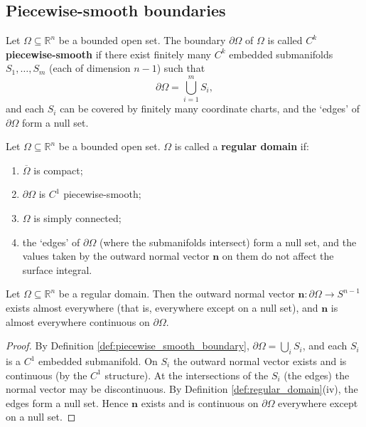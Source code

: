 \subsection{Piecewise-smooth boundaries}

\begin{definition}\label{def:piecewise_smooth_boundary}
Let $\Omega \subseteq \mathbb{R}^n$ be a bounded open set. The boundary $\partial \Omega$ of $\Omega$ is called \textbf{$C^k$ piecewise-smooth} if there exist finitely many $C^k$ embedded submanifolds $S_1, \dots, S_m$ (each of dimension $n-1$) such that
\[
\partial \Omega = \bigcup_{i=1}^{m} S_i,
\]
and each $S_i$ can be covered by finitely many coordinate charts, and the `edges' of $\partial \Omega$ form a null set.
\end{definition}

\begin{definition}\label{def:regular_domain}
Let $\Omega \subseteq \mathbb{R}^n$ be a bounded open set. $\Omega$ is called a \textbf{regular domain} if:
\begin{enumerate}[label=(\roman*)]
    \item $\overline{\Omega}$ is compact;
    \item $\partial \Omega$ is $C^1$ piecewise-smooth;
    \item $\Omega$ is simply connected;
    \item the `edges' of $\partial \Omega$ (where the submanifolds intersect) form a null set, and the values taken by the outward normal vector $\mathbf{n}$ on them do not affect the surface integral.
\end{enumerate}
\end{definition}

\begin{proposition}\label{prop:regular_domain_normal}
Let $\Omega \subseteq \mathbb{R}^n$ be a regular domain. Then the outward normal vector $\mathbf{n}: \partial \Omega \to S^{n-1}$ exists almost everywhere (that is, everywhere except on a null set), and $\mathbf{n}$ is almost everywhere continuous on $\partial \Omega$.
\end{proposition}

\begin{proof}
By Definition \ref{def:piecewise_smooth_boundary}, $\partial \Omega = \bigcup_i S_i$, and each $S_i$ is a $C^1$ embedded submanifold. On $S_i$ the outward normal vector exists and is continuous (by the $C^1$ structure). At the intersections of the $S_i$ (the edges) the normal vector may be discontinuous. By Definition \ref{def:regular_domain}(iv), the edges form a null set. Hence $\mathbf{n}$ exists and is continuous on $\partial \Omega$ everywhere except on a null set.
\end{proof}

